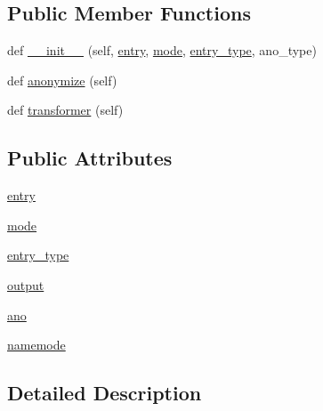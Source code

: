 \subsection*{Public Member Functions}
\begin{DoxyCompactItemize}
\item 
def \hyperlink{classparlai_1_1utils_1_1anonymizer_1_1Anonymizer_abb5227ee9a889aff79a0c657c76ffd71}{\+\_\+\+\_\+init\+\_\+\+\_\+} (self, \hyperlink{classparlai_1_1utils_1_1anonymizer_1_1Anonymizer_a348d1fd062fa3f57ad81cce32e8dd2c7}{entry}, \hyperlink{classparlai_1_1utils_1_1anonymizer_1_1Anonymizer_a535b959cd821885d5af2831644cde735}{mode}, \hyperlink{classparlai_1_1utils_1_1anonymizer_1_1Anonymizer_a11c56824a15faa979c46dde2422a4a78}{entry\+\_\+type}, ano\+\_\+type)
\item 
def \hyperlink{classparlai_1_1utils_1_1anonymizer_1_1Anonymizer_a4853ffad71c52d910e68752ee7a05200}{anonymize} (self)
\item 
def \hyperlink{classparlai_1_1utils_1_1anonymizer_1_1Anonymizer_a515fed7848150c353175b42ebe7d06c1}{transformer} (self)
\end{DoxyCompactItemize}
\subsection*{Public Attributes}
\begin{DoxyCompactItemize}
\item 
\hyperlink{classparlai_1_1utils_1_1anonymizer_1_1Anonymizer_a348d1fd062fa3f57ad81cce32e8dd2c7}{entry}
\item 
\hyperlink{classparlai_1_1utils_1_1anonymizer_1_1Anonymizer_a535b959cd821885d5af2831644cde735}{mode}
\item 
\hyperlink{classparlai_1_1utils_1_1anonymizer_1_1Anonymizer_a11c56824a15faa979c46dde2422a4a78}{entry\+\_\+type}
\item 
\hyperlink{classparlai_1_1utils_1_1anonymizer_1_1Anonymizer_a79c7f73d9f30bdf77d4274357272ca5e}{output}
\item 
\hyperlink{classparlai_1_1utils_1_1anonymizer_1_1Anonymizer_a93524d9b3d82d5cd637272cdf1dc816a}{ano}
\item 
\hyperlink{classparlai_1_1utils_1_1anonymizer_1_1Anonymizer_a1ebf22dc33a47f4a6f6a6833cdfe32f5}{namemode}
\end{DoxyCompactItemize}


\subsection{Detailed Description}


